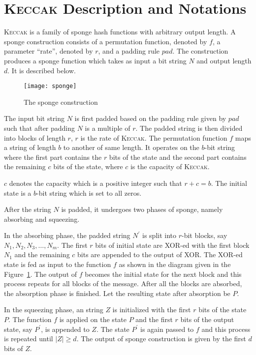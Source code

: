 \documentclass[runningheads]{llncs}
\newcommand{\KECCAK}{\mbox{\textsc{Keccak}}}
\newcommand{\Keccak}{\mbox{\textsc{Keccak}}}
\begin{document}
\section{\Keccak{} Description and Notations}
\Keccak{} is a family of sponge hash functions with arbitrary output length. A sponge construction consists of a permutation function, denoted by $f$, a parameter ``rate'', denoted by $r$, and a padding rule ${pad}$. The construction 
produces a sponge function which takes as input a bit string $N$ and output length $d$. 
It is described below.

\begin{figure}
\texttt{[image: sponge]}
\caption{The sponge construction~\cite{bertoni2011cryptographic}\label{sponge}}
\end{figure}
The input bit string $N$ is first padded based on the padding rule given by $pad$ such that after padding $N$ is a multiple of $r$. The padded string is then divided into blocks of length $r$, $r$ is the rate of \KECCAK{}. The permutation function $f$ maps a string of length $b$ to another of same length. It operates on the $b$-bit string where the first part contains the $r$ bits of the state and the second part contains the remaining $c$ bits of the state, where $c$ is the capacity of \KECCAK{}. 

$c$ denotes the capacity which is a positive integer such that $r + c = b$. The initial state is a $b$-bit string which is set to all zeros.

After the string $N$ is padded, it undergoes two phases of sponge, namely absorbing and squeezing. 

In the absorbing phase, the padded string $N^\prime$ is split into $r$-bit blocks, say $N_1, N_2, N_3,\ldots,N_m$. The first $r$ bits of initial state are XOR-ed with the first block $N_1$ and the remaining $c$ bits are appended to the output of XOR. The XOR-ed state is fed as input to the function $f$ as shown in the diagram given in the Figure~\ref{sponge}. The output of $f$ becomes the initial state for the next block and this process repeats for all blocks of the message. After all the blocks are absorbed, the absorption phase is finished. Let the resulting state after absorption be $P$. 

In the squeezing phase, an string $Z$ is initialized with the first $r$ bits of the state $P$. The function $f$ is applied on the state $P$ and the first $r$ bits of the output state, say $P^\prime$, is appended to $Z$. The state $P^\prime$ is again passed to $f$ and this process is repeated until $|Z| \geq d$. The output of sponge construction is given by the first $d$ bits of $Z$.
% 
\end{document}
